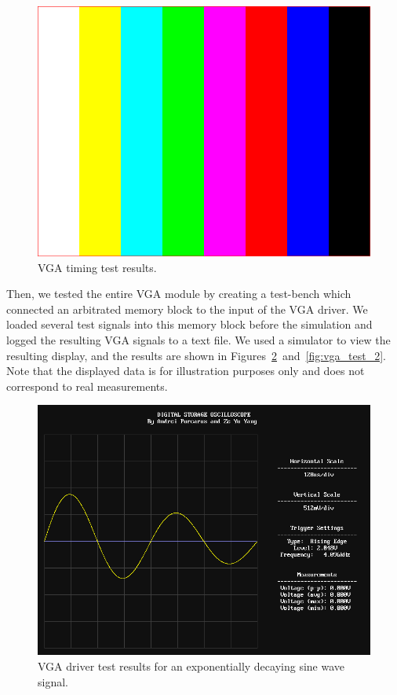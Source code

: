 \documentclass[journal]{IEEEtran}
\begin{document}
\begin{figure}[!htb]
  \centering
  \includegraphics[width=\columnwidth]{test-results/vga_timing.png}
  \caption{VGA timing test results.}
  \label{fig:vga_timing_test}
\end{figure}

Then, we tested the entire VGA module by creating a test-bench which connected an arbitrated memory block to the input of the VGA driver. We loaded several test signals into this memory block before the simulation and logged the resulting VGA signals to a text file. We used a simulator to view the resulting display, and the results are shown in Figures~\ref{fig:vga_test_1}~and~\ref{fig:vga_test_2}. Note that the displayed data is for illustration purposes only and does not correspond to real measurements.

\begin{figure}[!htb]
  \centering
  \includegraphics[width=\columnwidth]{test-results/vga_test_signal1.png}
  \caption{VGA driver test results for an exponentially decaying sine wave signal.}
  \label{fig:vga_test_1}
\end{figure}
\end{document}
